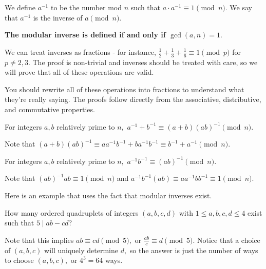 \documentclass[mast]{lucky}
\begin{document}
\begin{defi}
We define $a^{-1}$ to be the number mod $n$ such that $a\cdot a^{-1}\equiv 1 \pmod{n}.$ We say that $a^{-1}$ is the inverse of $a \pmod{n}.$

\textbf{The modular inverse is defined if and only if $\gcd(a,n)=1.$} \end{defi}


We can treat inverses as fractions - for instance, $\frac{1}{2}+\frac{1}{3}+\frac{1}{6}\equiv 1\pmod{p}$ for $p\neq 2,3.$ The proof is non-trivial and inverses should be treated with care, so we will prove that all of these operations are valid.

You should rewrite all of these operations into fractions to understand what they're really saying. The proofs follow directly from the associative, distributive, and commutative properties.

\begin{fact}
For integers $a,b$ relatively prime to $n,$ $a^{-1}+b^{-1}\equiv (a+b)(ab)^{-1}\pmod{n}.$
\end{fact}

\begin{pro}
Note that $(a+b)(ab)^{-1}\equiv aa^{-1}b^{-1}+ba^{-1}b^{-1}\equiv b^{-1}+a^{-1}\pmod{n}.$
\end{pro}

\begin{fact}
For integers $a,b$ relatively prime to $n,$ $a^{-1}b^{-1}\equiv(ab)^{-1}\pmod{n}.$
\end{fact}

\begin{pro}
Note that $(ab)^{-1}ab\equiv 1\pmod{n}$ and $a^{-1}b^{-1}(ab)\equiv aa^{-1}bb^{-1}\equiv 1\pmod{n}.$
\end{pro}

Here is an example that uses the fact that modular inverses exist.

\begin{exam}
How many ordered quadruplets of integers $(a,b,c,d)$ with $1\leq a,b,c,d\leq 4$ exist such that $5\mid ab-cd$?
\end{exam}

\begin{sol}
Note that this implies $ab\equiv cd\pmod{5},$ or $\frac{ab}{c}\equiv d\pmod{5}.$ Notice that a choice of $(a,b,c)$ will uniquely determine $d,$ so the answer is just the number of ways to choose $(a,b,c),$ or $4^3=64$ ways.
\end{sol}
\end{document}
